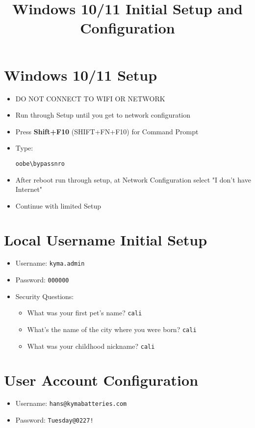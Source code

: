 \documentclass{article}
\title{Windows 10/11 Initial Setup and Configuration}
\author{}
\date{}
\begin{document}
\maketitle

\section*{Windows 10/11 Setup}
\begin{itemize}
    \item DO NOT CONNECT TO WIFI OR NETWORK
    \item Run through Setup until you get to network configuration
    \item Press \textbf{Shift+F10} (SHIFT+FN+F10) for Command Prompt
    \item Type: \begin{verbatim}oobe\bypassnro\end{verbatim}
    \item After reboot run through setup, at Network Configuration select "I don't have Internet"
    \item Continue with limited Setup
\end{itemize}

\section*{Local Username Initial Setup}
\begin{itemize}
    \item Username: \texttt{kyma.admin}
    \item Password: \texttt{000000}
    \item Security Questions:
    \begin{itemize}
        \item What was your first pet's name? \texttt{cali}
        \item What's the name of the city where you were born? \texttt{cali}
        \item What was your childhood nickname? \texttt{cali}
    \end{itemize}
\end{itemize}

\section*{User Account Configuration}
\begin{itemize}
    \item Username: \texttt{hans@kymabatteries.com}
    \item Password: \texttt{Tuesday@0227!}
\end{itemize}
\end{document}
